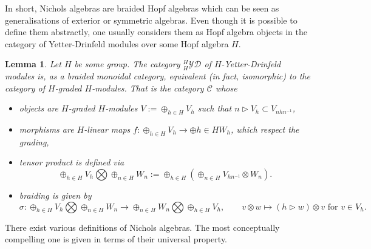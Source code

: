 \documentclass{amsart}
\newtheorem{lemma}{Lemma}
\theoremstyle{definition}
\newcommand{\YD}[1]{\ensuremath{{}^{#1}_{#1}\mathcal{YD}}}
\begin{document}
		In short, Nichols algebras are braided Hopf algebras which can be seen as generalisations of exterior or symmetric algebras. Even though it is possible to define them abstractly, one usually considers them as Hopf algebra objects in the category of Yetter-Drinfeld modules over some Hopf algebra $H$.
	\begin{lemma}
		Let $H$ be some group. The category $\YD{H}$ of $H$-Yetter-Drinfeld modules is, as a braided monoidal category, equivalent (in fact, isomorphic) to the category of $H$-graded $H$-modules. That is the category $\mathcal C$ whose
		\begin{itemize}
			\item  objects are $H$-graded $H$-modules $V:= \oplus_{h\in H} V_h$ such that
			$n \triangleright V_h \subset V_{nhn^{-1}}$,
			\item morphisms are $H$-linear maps $f: \oplus_{h\in H} V_h \rightarrow \oplus{h\in H} W_h$, which respect the grading,
			\item tensor product is defined via
			$$
			\oplus_{h\in H} V_h \bigotimes \oplus_{n \in H} W_n := \oplus_{h \in H}(\oplus_{n \in H} V_{hn^{-1}} \otimes W_n).
			$$
			\item braiding is given by
			$$
			\sigma: \oplus_{h\in H} V_h \bigotimes \oplus_{n \in H} W_n \rightarrow 
			\oplus_{n \in H} W_n \bigotimes \oplus_{h\in H} V_h, \qquad  v\otimes  w \mapsto \left(h \triangleright w\right) \otimes v \text{ for } v\in V_h.
			$$	
		\end{itemize}
	\end{lemma}
	
	There exist various definitions of Nichols algebras. The most conceptually compelling one is given in terms of  their universal property.
	
\end{document}
